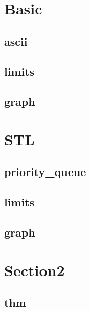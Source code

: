 \section{Basic}
    \subsection{ascii}
        
    \subsection{limits}
            
    \subsection{graph}
        

\section{STL}
    \subsection{priority_queue}
        
    \subsection{limits}
            
    \subsection{graph}
        
        
\section{Section2}
    \subsection{thm}
        